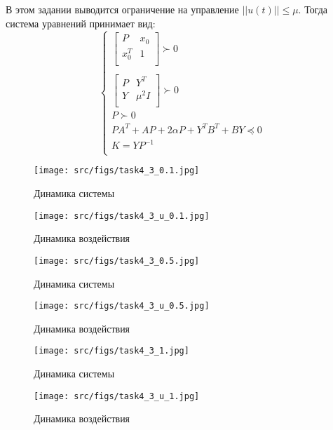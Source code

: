 В этом задании выводится ограничение на управление \(||u(t)|| \leq \mu\). Тогда система уравнений принимает вид: 
\[
        \begin{cases}
                \begin{bmatrix}
                    P &  x_0\\
                    x_0^T &  1 \\
                \end{bmatrix} \succ 0 \\
                \\
                \begin{bmatrix}
                    P &  Y^T\\
                    Y &  \mu^2I \\
                \end{bmatrix} \succ 0 \\
                P \succ 0 \\
                PA^T + AP + 2 \alpha P + Y^T B^T + BY \preccurlyeq 0  \\
                K = YP^{-1}\\
        \end{cases} 
\]
\begin{figure}[ht!]
    \centering
    \texttt{[image: src/figs/task4\_3\_0.1.jpg]}
    \caption{Динамика системы}
    \label{fig:task4_3_0.1}
\end{figure}
\begin{figure}[ht!]
    \centering
    \texttt{[image: src/figs/task4\_3\_u\_0.1.jpg]}
    \caption{Динамика воздействия}
    \label{fig:task4_3_u_0.1}
\end{figure}

\begin{figure}[ht!]
    \centering
    \texttt{[image: src/figs/task4\_3\_0.5.jpg]}
    \caption{Динамика системы}
    \label{fig:task4_3_0.5}
\end{figure}
\begin{figure}[ht!]
    \centering
    \texttt{[image: src/figs/task4\_3\_u\_0.5.jpg]}
    \caption{Динамика воздействия}
    \label{fig:task4_3_u_0.5}
\end{figure}

\begin{figure}[ht!]
    \centering
    \texttt{[image: src/figs/task4\_3\_1.jpg]}
    \caption{Динамика системы}
    \label{fig:task4_3_1}
\end{figure}
\begin{figure}[ht!]
    \centering
    \texttt{[image: src/figs/task4\_3\_u\_1.jpg]}
    \caption{Динамика воздействия}
    \label{fig:task4_3_u_1}
\end{figure}
\FloatBarrier

